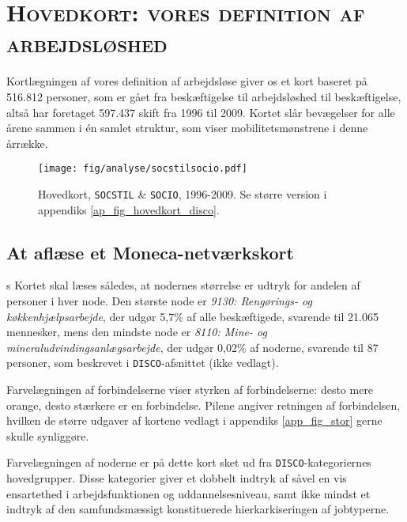 

\newpage \section{\textsc{Hovedkort: vores definition af arbejdsløshed \label{}}}

Kortlægningen af vores definition af arbejdsløse giver os et kort baseret på 516.812 personer, som er gået fra beskæftigelse til arbejdsløshed til beskæftigelse, altså har foretaget 597.437 skift fra 1996 til 2009. Kortet slår bevægelser for alle årene sammen i én samlet struktur, som viser mobilitetsmønstrene i denne årrække.
%  
\begin{figure}[H]
\begin{centering}
	\caption{Hovedkort, \texttt{SOCSTIL} \& \texttt{SOCIO}, 1996-2009. Se større version i appendiks \ref{ap_fig_hovedkort_disco}.}
	\texttt{[image: fig/analyse/socstilsocio.pdf]}
	\label{fig_hist_beskaeftigede_allekategorier132}
\end{centering}
\end{figure}
%

\subsection{At aflæse et Moneca-netværkskort}
s
Kortet skal læses således, at nodernes størrelse er udtryk for andelen af personer i hver node. Den største node er \textit{9130: Rengørings- og køkkenhjælpsarbejde}, der udgør 5,7\% af alle beskæftigede, svarende til 21.065 mennesker, mens den mindste node er \textit{8110: Mine- og mineraludvindingsanlægsarbejde}, der udgør 0,02\% af noderne, svarende til 87 personer, som beskrevet i \texttt{DISCO}-afsnittet (ikke vedlagt).

Farvelægningen af forbindelserne viser styrken af forbindelserne: desto mere orange, desto stærkere er en forbindelse. Pilene angiver retningen af forbindelsen, hvilken de større udgaver af kortene vedlagt i appendiks \ref{app_fig_stor} gerne skulle synliggøre.

Farvelægningen af noderne er på dette kort sket ud fra \texttt{DISCO}-kategoriernes hovedgrupper. Disse kategorier giver et dobbelt indtryk af såvel en vis ensartethed i arbejdsfunktionen og uddannelsesniveau, samt ikke mindst et indtryk af den samfundsmæssigt konstituerede hierkarkiseringen af jobtyperne.

